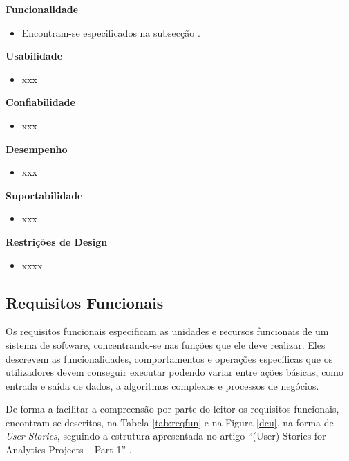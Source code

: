 \vspace{5mm}

\textbf{Funcionalidade}
\begin{itemize}
  \item Encontram-se especificados na subsecção .
\end{itemize}

\textbf{Usabilidade}
\begin{itemize}
  \item xxx
\end{itemize}

\textbf{Confiabilidade}
\begin{itemize}
  \item xxx
\end{itemize}

\textbf{Desempenho}
\begin{itemize}
  \item xxx
\end{itemize}

\textbf{Suportabilidade}
\begin{itemize}
  \item xxx
\end{itemize}

\textbf{Restrições de Design}
\begin{itemize}
  \item xxxx
\end{itemize}

\subsection{Requisitos Funcionais}
\label{sec:3-rf}

Os requisitos funcionais especificam as unidades e recursos funcionais de um sistema de software, 
concentrando-se nas funções que ele deve realizar. Eles descrevem as funcionalidades, comportamentos
e operações específicas que os utilizadores devem conseguir executar podendo variar entre ações básicas, 
como entrada e saída de dados, a algoritmos complexos e processos de negócios.

De forma a facilitar a compreensão por parte do leitor os requisitos funcionais,
encontram-se descritos, na Tabela \ref{tab:reqfun} e na Figura \ref{dcu}, na forma de \textit{User Stories}, 
seguindo a estrutura apresentada no artigo “(User) Stories for Analytics Projects – Part 1” \cite{us}.

